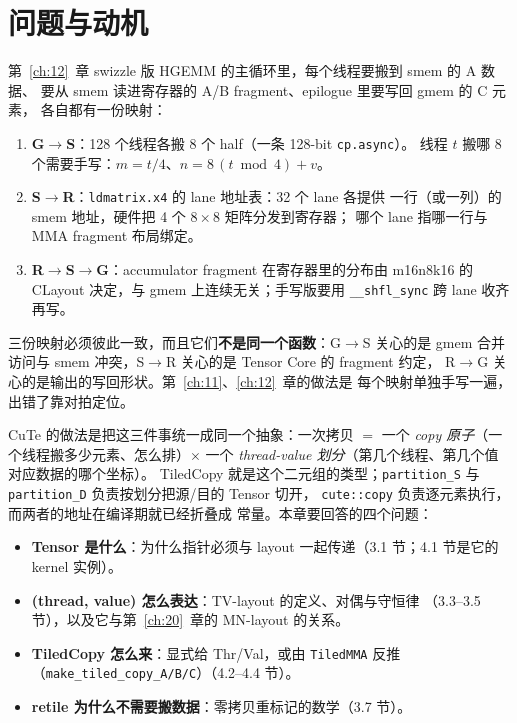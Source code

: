 \section{问题与动机}

第~\ref{ch:12}~章 swizzle 版 HGEMM 的主循环里，每个线程要搬到 smem 的 A 数据、
要从 smem 读进寄存器的 A/B fragment、epilogue 里要写回 gmem 的 C 元素，
各自都有一份映射：

\begin{enumerate}
  \item \textbf{G$\to$S}：128 个线程各搬 8 个 half（一条 128-bit \texttt{cp.async}）。
        线程 $t$ 搬哪 8 个需要手写：$m = t/4$、$n = 8\,(t \bmod 4) + v$。
  \item \textbf{S$\to$R}：\texttt{ldmatrix.x4} 的 lane 地址表：32 个 lane 各提供
        一行（或一列）的 smem 地址，硬件把 4 个 $8\times8$ 矩阵分发到寄存器；
        哪个 lane 指哪一行与 MMA fragment 布局绑定。
  \item \textbf{R$\to$S$\to$G}：accumulator fragment 在寄存器里的分布由
        m16n8k16 的 CLayout 决定，与 gmem 上连续无关；手写版要用
        \texttt{\_\_shfl\_sync} 跨 lane 收齐再写。
\end{enumerate}

三份映射必须彼此一致，而且它们\textbf{不是同一个函数}：G$\to$S 关心的是
gmem 合并访问与 smem 冲突，S$\to$R 关心的是 Tensor Core 的 fragment 约定，
R$\to$G 关心的是输出的写回形状。第~\ref{ch:11}、\ref{ch:12}~章的做法是
每个映射单独手写一遍，出错了靠对拍定位。

\begin{sloppypar}
CuTe 的做法是把这三件事统一成同一个抽象：一次拷贝 $=$ 一个
\emph{copy 原子}（一个线程搬多少元素、怎么排）$\times$ 一个
\emph{thread-value 划分}（第几个线程、第几个值对应数据的哪个坐标）。
TiledCopy 就是这个二元组的类型；\texttt{partition\_S} 与
\texttt{partition\_D} 负责按划分把源/目的 Tensor 切开，
\texttt{cute::copy} 负责逐元素执行，而两者的地址在编译期就已经折叠成
常量。本章要回答的四个问题：
\end{sloppypar}

\begin{itemize}
  \item \textbf{Tensor 是什么}：为什么指针必须与 layout 一起传递（3.1 节；4.1 节是它的
        kernel 实例）。
  \item \textbf{(thread, value) 怎么表达}：TV-layout 的定义、对偶与守恒律
        （3.3--3.5 节），以及它与第~\ref{ch:20}~章的 MN-layout 的关系。
  \item \textbf{TiledCopy 怎么来}：显式给 Thr/Val，或由 \texttt{TiledMMA}
        反推（\texttt{make\_\allowbreak{}tiled\_\allowbreak{}copy\_\allowbreak{}A/\allowbreak{}B/\allowbreak{}C}）（4.2--4.4 节）。
  \item \textbf{retile 为什么不需要搬数据}：零拷贝重标记的数学（3.7 节）。
\end{itemize}

